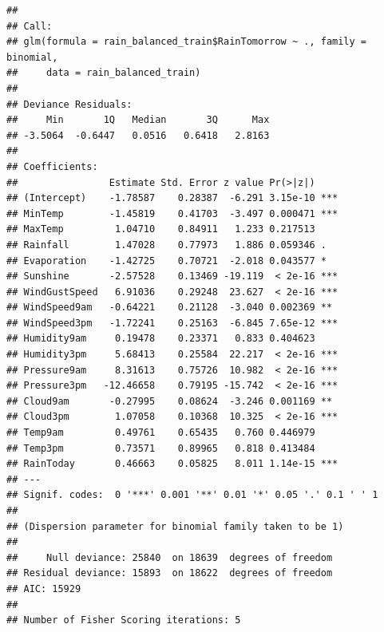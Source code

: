 \documentclass[
]{article}
\begin{document}
\begin{verbatim}
## 
## Call:
## glm(formula = rain_balanced_train$RainTomorrow ~ ., family = binomial, 
##     data = rain_balanced_train)
## 
## Deviance Residuals: 
##     Min       1Q   Median       3Q      Max  
## -3.5064  -0.6447   0.0516   0.6418   2.8163  
## 
## Coefficients:
##                Estimate Std. Error z value Pr(>|z|)    
## (Intercept)    -1.78587    0.28387  -6.291 3.15e-10 ***
## MinTemp        -1.45819    0.41703  -3.497 0.000471 ***
## MaxTemp         1.04710    0.84911   1.233 0.217513    
## Rainfall        1.47028    0.77973   1.886 0.059346 .  
## Evaporation    -1.42725    0.70721  -2.018 0.043577 *  
## Sunshine       -2.57528    0.13469 -19.119  < 2e-16 ***
## WindGustSpeed   6.91036    0.29248  23.627  < 2e-16 ***
## WindSpeed9am   -0.64221    0.21128  -3.040 0.002369 ** 
## WindSpeed3pm   -1.72241    0.25163  -6.845 7.65e-12 ***
## Humidity9am     0.19478    0.23371   0.833 0.404623    
## Humidity3pm     5.68413    0.25584  22.217  < 2e-16 ***
## Pressure9am     8.31613    0.75726  10.982  < 2e-16 ***
## Pressure3pm   -12.46658    0.79195 -15.742  < 2e-16 ***
## Cloud9am       -0.27995    0.08624  -3.246 0.001169 ** 
## Cloud3pm        1.07058    0.10368  10.325  < 2e-16 ***
## Temp9am         0.49761    0.65435   0.760 0.446979    
## Temp3pm         0.73571    0.89965   0.818 0.413484    
## RainToday       0.46663    0.05825   8.011 1.14e-15 ***
## ---
## Signif. codes:  0 '***' 0.001 '**' 0.01 '*' 0.05 '.' 0.1 ' ' 1
## 
## (Dispersion parameter for binomial family taken to be 1)
## 
##     Null deviance: 25840  on 18639  degrees of freedom
## Residual deviance: 15893  on 18622  degrees of freedom
## AIC: 15929
## 
## Number of Fisher Scoring iterations: 5
\end{verbatim}
\end{document}
